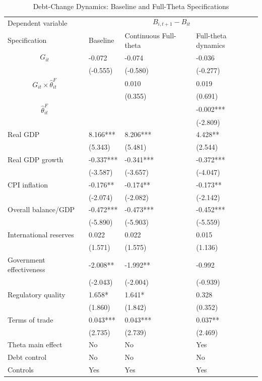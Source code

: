 \begin{table}[H]\centering
\begin{threeparttable}
\caption{Debt-Change Dynamics: Baseline and Full-Theta Specifications}
\label{tab:debt_change_combined_fulltheta}
\scriptsize
\begin{tabularx}{\textwidth}{lYYY}
\toprule
Dependent variable &  \\
\cmidrule(lr){2-4}
Specification & Baseline & Continuous Full-theta & Full-theta dynamics \\
\midrule
$$G_{it}$$ & -0.072 & -0.074 & -0.036 \\
 & (-0.555) & (-0.580) & (-0.277) \\
$$G_{it}\times\widehat{\theta}^{F}_{it}$$ &  & 0.010 & 0.019 \\
 &  & (0.355) & (0.691) \\
$$\widehat{\theta}^{F}_{it}$$ &  &  & -0.002*** \\
 &  &  & (-2.809) \\
Real GDP & 8.166*** & 8.206*** & 4.428** \\
 & (5.343) & (5.481) & (2.544) \\
Real GDP growth & -0.337*** & -0.341*** & -0.372*** \\
 & (-3.587) & (-3.657) & (-4.047) \\
CPI inflation & -0.176** & -0.174** & -0.173** \\
 & (-2.074) & (-2.082) & (-2.142) \\
Overall balance/GDP & -0.472*** & -0.473*** & -0.452*** \\
 & (-5.890) & (-5.903) & (-5.559) \\
International reserves & 0.022 & 0.022 & 0.015 \\
 & (1.571) & (1.575) & (1.136) \\
Government effectiveness & -2.008** & -1.992** & -0.992 \\
 & (-2.043) & (-2.004) & (-0.939) \\
Regulatory quality & 1.658* & 1.641* & 0.328 \\
 & (1.860) & (1.842) & (0.352) \\
Terms of trade & 0.043*** & 0.043*** & 0.037** \\
 & (2.735) & (2.739) & (2.469) \\
\midrule
Theta main effect & No & No & Yes \\
Debt control & No & No & No \\
Controls & Yes & Yes & Yes \\

\end{tabularx}
\end{threeparttable}
\end{table}
